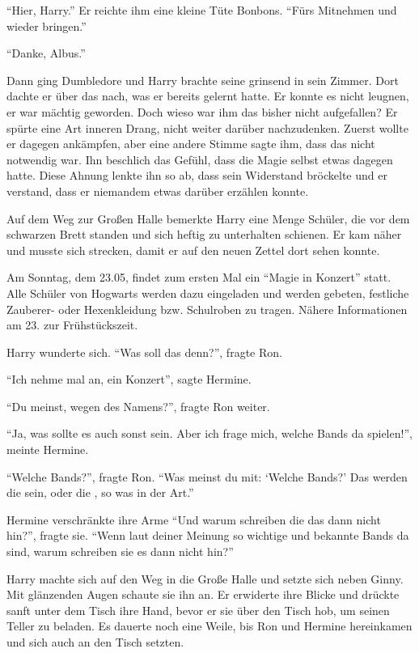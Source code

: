 \enquote{Hier, Harry.} Er reichte ihm eine kleine Tüte Bonbons. \enquote{Fürs Mitnehmen und wieder bringen.}

\enquote{Danke, Albus.}

Dann ging Dumbledore und Harry brachte seine  grinsend in sein Zimmer. Dort dachte er über das nach, was er bereits gelernt hatte. Er konnte es nicht leugnen, er war mächtig geworden. Doch wieso war ihm das bisher nicht aufgefallen? Er spürte eine Art inneren Drang, nicht weiter darüber nachzudenken. Zuerst wollte er dagegen ankämpfen, aber eine andere Stimme sagte ihm, dass das nicht notwendig war. Ihn beschlich das Gefühl, dass die Magie selbst etwas dagegen hatte. Diese Ahnung lenkte ihn so ab, dass sein Widerstand bröckelte und er verstand, dass er niemandem etwas darüber erzählen konnte.

\trenn

Auf dem Weg zur Großen Halle bemerkte Harry eine Menge Schüler, die vor dem schwarzen Brett standen und sich heftig zu unterhalten schienen. Er kam näher und musste sich strecken, damit er auf den neuen Zettel dort sehen konnte.

\begin{brief}
Am Sonntag, dem 23.05, findet zum ersten Mal ein \enquote{Magie in Konzert} statt. Alle Schüler von Hogwarts werden dazu eingeladen und werden gebeten, festliche Zauberer- oder Hexenkleidung bzw. Schulroben zu tragen. Nähere Informationen am 23. zur Frühstückszeit.
\end{brief}

Harry wunderte sich. \enquote{Was soll das denn?}, fragte Ron.

\enquote{Ich nehme mal an, ein Konzert}, sagte Hermine.

\enquote{Du meinst, wegen des Namens?}, fragte Ron weiter.

\enquote{Ja, was sollte es auch sonst sein. Aber ich frage mich, welche Bands da spielen!}, meinte Hermine.

\enquote{Welche Bands?}, fragte Ron. \enquote{Was meinst du mit: \enquote{Welche Bands?} Das werden die  sein, oder die , so was in der Art.}

Hermine verschränkte ihre Arme \enquote{Und warum schreiben die das dann nicht hin?}, fragte sie. \enquote{Wenn laut deiner Meinung so wichtige und bekannte Bands da sind, warum schreiben sie es dann nicht hin?}

Harry machte sich auf den Weg in die Große Halle und setzte sich neben Ginny. Mit glänzenden Augen schaute sie ihn an. Er erwiderte ihre Blicke und drückte sanft unter dem Tisch ihre Hand, bevor er sie über den Tisch hob, um seinen Teller zu beladen. Es dauerte noch eine Weile, bis Ron und Hermine hereinkamen und sich auch an den Tisch setzten.

